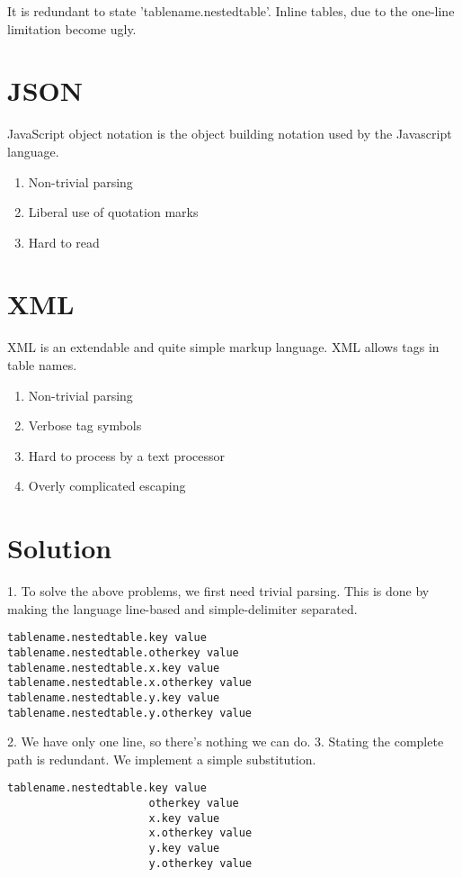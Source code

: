 \documentclass[listof=totoc]{article}
\begin{document}
It is redundant to state 'tablename.nestedtable'. Inline tables, due to the one-line limitation become ugly.

\section{JSON}
JavaScript object notation is the object building notation used by the Javascript language.
\begin{enumerate}
	\item Non-trivial parsing
	\item Liberal use of quotation marks
	\item Hard to read
\end{enumerate}

\section{XML}
XML is an extendable and quite simple markup language. XML allows tags in table names.
\begin{enumerate}
	\item Non-trivial parsing
	\item Verbose tag symbols
	\item Hard to process by a text processor
	\item Overly complicated escaping
\end{enumerate}

\section{Solution}
1. To solve the above problems, we first need trivial parsing. This is done by making the language line-based and simple-delimiter separated.

\begin{verbatim}
tablename.nestedtable.key value
tablename.nestedtable.otherkey value
tablename.nestedtable.x.key value
tablename.nestedtable.x.otherkey value
tablename.nestedtable.y.key value
tablename.nestedtable.y.otherkey value
\end{verbatim}

2. We have only one line, so there's nothing we can do.
3. Stating the complete path is redundant. We implement a simple substitution.

\begin{verbatim}
tablename.nestedtable.key value
                      otherkey value
                      x.key value
                      x.otherkey value
                      y.key value
                      y.otherkey value
\end{verbatim}
\end{document}
